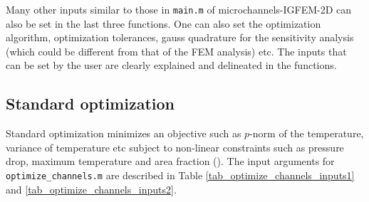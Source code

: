 \documentclass[11pt,letterpaper]{article}
\renewcommand\cite[1]{(\citet{#1})}
\begin{document}
Many other inputs similar to those in \texttt{main.m} of microchannels-IGFEM-2D can also be set in the last three functions. One can also set the optimization algorithm, optimization tolerances, gauss quadrature for the sensitivity analysis (which could be different from that of the FEM analysis) etc. The inputs that can be set by the user are clearly explained and delineated in the functions.

\subsection{Standard optimization}
\label{subsec_standard_optimization}
Standard optimization minimizes an objective such as $p$-norm of the temperature, variance of temperature etc subject to non-linear constraints such as pressure drop, maximum temperature and area fraction \cite{Tan16}. The input arguments for \texttt{optimize\_channels.m} are described in Table \ref{tab_optimize_channels_inputs1} and \ref{tab_optimize_channels_inputs2}. 
\end{document}
